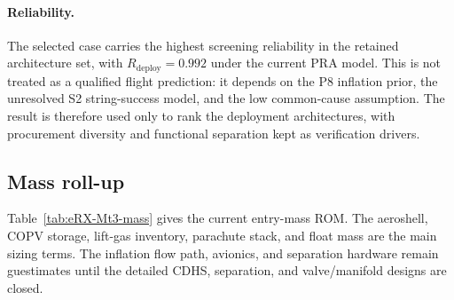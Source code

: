 \paragraph*{Reliability.} The selected case carries the highest screening reliability in the retained architecture set, with $R_\text{deploy}=0.992$ under the current PRA model. This is not treated as a qualified flight prediction: it depends on the P8 inflation prior, the unresolved S2 string-success model, and the low common-cause assumption. The result is therefore used only to rank the deployment architectures, with procurement diversity and functional separation kept as verification drivers.

\subsection{Mass roll-up}
Table~\ref{tab:eRX-Mt3-mass} gives the current entry-mass ROM. The aeroshell, COPV storage, lift-gas inventory, parachute stack, and float mass are the main sizing terms. The inflation flow path, avionics, and separation hardware remain guestimates until the detailed CDHS, separation, and valve/manifold designs are closed.

